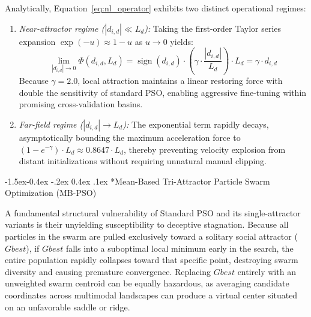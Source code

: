 \documentclass[10pt]{article}
\makeatletter
\renewcommand\subsubsection{\@startsection{subsubsection}{3}{\z@}%
                                     {-1.5ex\@plus -0.4ex \@minus -.2ex}%
                                     {0.4ex \@plus .1ex}%
                                     {\normalfont\itshape\fontsize{7.8pt}{10.0pt}\selectfont}}
\makeatother
\begin{document}
Analytically, Equation~\eqref{eq:nl_operator} exhibits two distinct operational regimes:
\begin{enumerate}
    \item \textit{Near-attractor regime ($|d_{i,d}| \ll L_d$):} Taking the first-order Taylor series expansion $\exp(-u) \approx 1 - u$ as $u \to 0$ yields:
    \begin{equation}
    \lim_{|d_{i,d}| \to 0} \Phi(d_{i,d}, L_d) = \operatorname{sign}(d_{i,d}) \cdot \left( \gamma \cdot \frac{|d_{i,d}|}{L_d} \right) \cdot L_d = \gamma \cdot d_{i,d}
    \end{equation}
    Because $\gamma = 2.0$, local attraction maintains a linear restoring force with double the sensitivity of standard PSO, enabling aggressive fine-tuning within promising cross-validation basins.
    \item \textit{Far-field regime ($|d_{i,d}| \to L_d$):} The exponential term rapidly decays, asymptotically bounding the maximum acceleration force to $(1 - e^{-\gamma}) \cdot L_d \approx 0.8647 \cdot L_d$, thereby preventing velocity explosion from distant initializations without requiring unnatural manual clipping.
\end{enumerate}


\subsubsection*{Mean-Based Tri-Attractor Particle Swarm Optimization (MB-PSO)}

A fundamental structural vulnerability of Standard PSO and its single-attractor variants is their unyielding susceptibility to deceptive stagnation. Because all particles in the swarm are pulled exclusively toward a solitary social attractor ($Gbest$), if $Gbest$ falls into a suboptimal local minimum early in the search, the entire population rapidly collapses toward that specific point, destroying swarm diversity and causing premature convergence. Replacing $Gbest$ entirely with an unweighted swarm centroid can be equally hazardous, as averaging candidate coordinates across multimodal landscapes can produce a virtual center situated on an unfavorable saddle or ridge.
\end{document}

